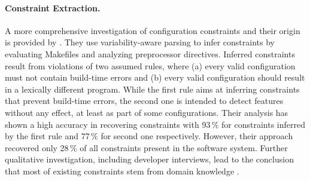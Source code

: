 \paragraph{Constraint Extraction.} 
A more comprehensive investigation of configuration
constraints and their origin is provided by
\cite{nadi_mining_2014,nadi_where_2015}. They use variability-aware parsing to
infer constraints by evaluating Makefiles and  analyzing preprocessor
directives. Inferred constraints result from violations of two assumed rules,
where (a) every valid configuration must not contain build-time errors and (b)
every valid configuration should result in a lexically different program.
While the
first rule aims at inferring constraints that prevent build-time errors, the
second one is intended to detect features without any effect, at least as part
of some configurations. Their analysis has shown a high accuracy
in recovering constraints with 93\,\% for constraints inferred by the first rule
and 77\,\% for second one respectively. However, their approach
recovered only 28\,\% of all constraints present in the software system.
Further qualitative investigation, including developer interviews, lead to
the conclusion that most of existing constraints stem from domain knowledge
\citep{nadi_where_2015}.

